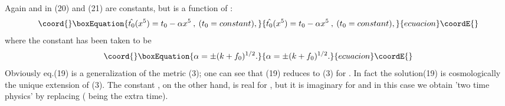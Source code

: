 \documentclass[a4paper,12pt]{article}
\begin{document}
 Again \coordHE{} and \coordHE{} in (20) and (21) are constants, but
 \coordHE{} is a function of \coordHE{} :
 \begin{equation}\coord{}\boxEquation{
 \hat{t_0}(x^5) = t_0 -\alpha x^5 \: , \: (t_0 =constant) ,
 }{
 \hat{t_0}(x^5) = t_0 -\alpha x^5 \: , \: (t_0 =constant) ,
 }{ecuacion}\coordE{}\end{equation}
 where the constant \myHighlight{$\alpha$}\coordHE{} has been taken to be
 \begin{equation}\coord{}\boxEquation{
 \alpha = \pm (k + f_0) ^{1/2}  .
 }{
 \alpha = \pm (k + f_0) ^{1/2}  .
 }{ecuacion}\coordE{}\end{equation}
Obviously eq.(19) is a generalization of the metric (3); one can
see that (19) reduces to (3) for \coordHE{}. In fact the
solution(19) is cosmologically the unique extension of (3). The
constant \myHighlight{$\alpha$}\coordHE{}, on the other hand, is real for \coordHE{},
but it is imaginary for \coordHE{} and in this case we obtain 'two
time physics' \cite{bar} by replacing \coordHE{}
(\myHighlight{$\tau$}\coordHE{} being the extra time).
\end{document}
